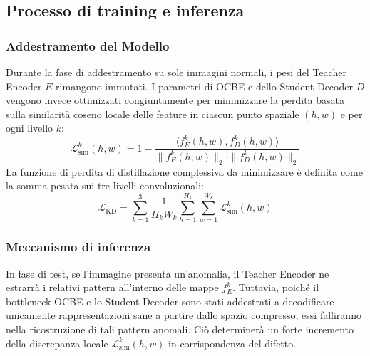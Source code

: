 \subsection{Processo di training e inferenza}

\subsubsection{Addestramento del Modello}
Durante la fase di addestramento su sole immagini normali, i pesi del Teacher Encoder $E$ rimangono immutati. I parametri di OCBE e dello Student Decoder $D$ vengono invece ottimizzati congiuntamente per minimizzare la perdita basata sulla similarità coseno locale delle feature in ciascun punto spaziale $(h, w)$ e per ogni livello $k$:
\begin{equation}
    \mathcal{L}_{\text{sim}}^k(h, w) = 1 - \frac{\langle f_E^k(h, w), f_D^k(h, w) \rangle}{\|f_E^k(h, w)\|_2 \cdot \|f_D^k(h, w)\|_2}
\end{equation}
La funzione di perdita di distillazione complessiva da minimizzare è definita come la somma pesata sui tre livelli convoluzionali:
\begin{equation}
    \mathcal{L}_{\text{KD}} = \sum_{k=1}^3 \frac{1}{H_k W_k} \sum_{h=1}^{H_k} \sum_{w=1}^{W_k} \mathcal{L}_{\text{sim}}^k(h, w)
\end{equation}

\subsubsection{Meccanismo di inferenza}
In fase di test, se l'immagine presenta un'anomalia, il Teacher Encoder ne estrarrà i relativi pattern all'interno delle mappe $f_E^k$. Tuttavia, poiché il bottleneck OCBE e lo Student Decoder sono stati addestrati a decodificare unicamente rappresentazioni sane a partire dallo spazio compresso, essi falliranno nella ricostruzione di tali pattern anomali. Ciò determinerà un forte incremento della discrepanza locale $\mathcal{L}_{\text{sim}}^k(h, w)$ in corrispondenza del difetto.


